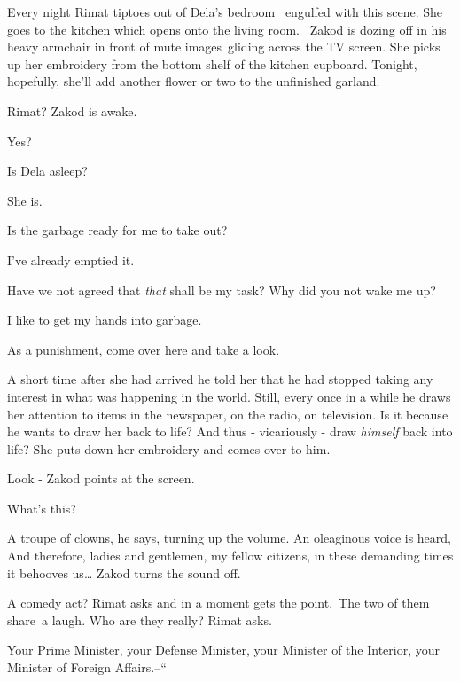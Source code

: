 \documentclass[12pt]{book}
\begin{document}
Every night Rimat tiptoes out of Dela's bedroom \ engulfed with this scene. She goes to the kitchen which opens onto the
living room. \ Zakod is dozing off in his heavy armchair in front of mute images~gliding across the TV screen. She
picks up her embroidery from the bottom shelf of the kitchen cupboard. Tonight, hopefully, she'll add another flower or
two to the unfinished garland.

{\textquotedbl}Rimat?{\textquotedbl} Zakod is awake.

{\textquotedbl}Yes?{\textquotedbl}

{\textquotedbl}Is Dela asleep?{\textquotedbl}

{\textquotedbl}She is.{\textquotedbl}

{\textquotedbl}Is the garbage ready for me to take out?{\textquotedbl}

{\textquotedbl}I've already emptied it.{\textquotedbl}

{\textquotedbl}Have we not agreed that \textit{that} shall be my task? Why did you not wake me up?{\textquotedbl}

{\textquotedbl}I like to get my hands into garbage.{\textquotedbl}

{\textquotedbl}As a punishment, come over here and take a look.{\textquotedbl}

A short time after she had arrived he told her that he had stopped taking any interest in what was happening in the
world. Still, every once in a while he draws her attention to items in the newspaper, on the radio, on television. Is
it because he wants to draw her back to life? And thus - vicariously - draw \textit{himself} back into life? She puts
down her embroidery and comes over to him.

{\textquotedbl}Look -{\textquotedbl} Zakod points at the screen.

{\textquotedbl}What's this?{\textquotedbl}

{\textquotedbl}A troupe of clowns,{\textquotedbl} he says, turning up the volume. An oleaginous voice is heard,
{\textquotedbl}And therefore, ladies and gentlemen, my fellow citizens, in these demanding times it behooves
us{\dots}{\textquotedbl} Zakod turns the sound off.

{\textquotedbl}A comedy act?{\textquotedbl} Rimat asks and in a moment gets the point.~The two of them share~a laugh.
{\textquotedbl}Who are they really?{\textquotedbl} Rimat asks.

{\textquotedbl}Your Prime Minister, your Defense Minister, your Minister of the Interior, your Minister of Foreign
Affairs.--``
\end{document}
